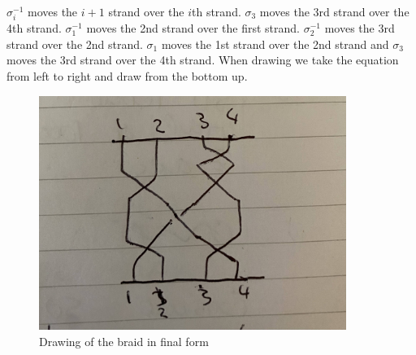 \documentclass[12pt]{article}
\begin{document}
\begin{enumerate}
\begin{figure}[h]
\end{figure}
$\sigma_i^{-1}$ moves the $i+1$ strand over the $i$th strand. $\sigma_3$ moves the 3rd strand over the 4th strand. $\sigma_1^{-1}$ moves the 2nd strand over the first strand. $\sigma_2^{-1}$ moves the 3rd strand over the 2nd strand. $\sigma_1$ moves the 1st strand over the 2nd strand and $\sigma_3$ moves the 3rd strand over the 4th strand. When drawing we take the equation from left to right and draw from the bottom up. 
\begin{figure}[H]
  \includegraphics[width=10cm]{answer.jpg}
  \centering 
  \caption{Drawing of the braid in final form}


\end{figure}
\end{enumerate}
\end{document}
